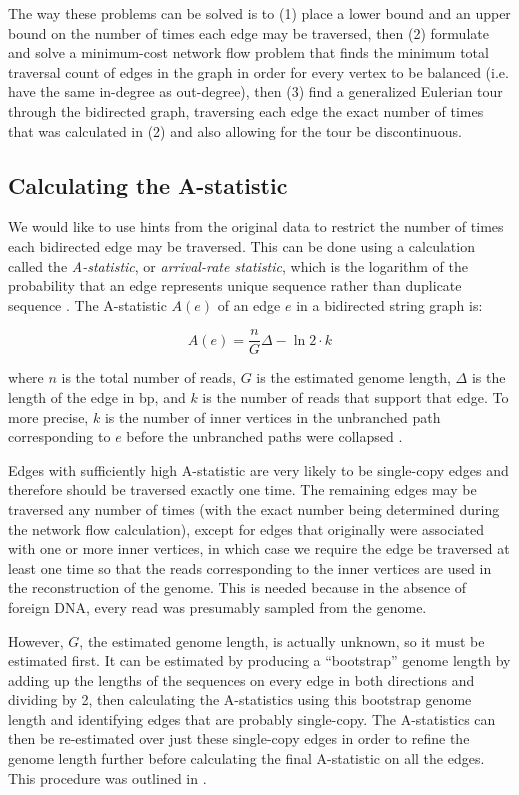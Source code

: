 \documentclass[12pt]{article}
\newcommand{\KeyTerm}[1]{{\it #1}}
\begin{document}
The way these problems can be solved is to (1) place a lower bound and an upper
bound on the number of times each edge may be traversed, then (2) formulate and
solve a minimum-cost network flow problem that finds the minimum total traversal
count of edges in the graph in order for every vertex to be balanced (i.e. have
the same in-degree as out-degree), then (3) find a generalized Eulerian tour
through the bidirected graph, traversing each edge the exact number of times
that was calculated in (2) and also allowing for the tour be discontinuous.

\subsection{Calculating the A-statistic}

We would like to use hints from the original data to restrict the number of
times each bidirected edge may be traversed.  This can be done using a
calculation called the \KeyTerm{A-statistic}, or \KeyTerm{arrival-rate
statistic}, which is the logarithm of the probability that an edge represents
unique sequence rather than duplicate sequence \cite{Myers2005}.  The A-statistic
$A(e)$ of an edge $e$ in a bidirected string graph is:

\[ A(e) = \frac{n}{G} \Delta - \ln{2} \cdot {k} \]

where $n$ is the total number of reads, $G$ is the estimated genome length,
$\Delta$ is the length of the edge in bp, and $k$ is the number of reads that
support that edge.  To more precise, $k$ is the number of inner vertices in the
unbranched path corresponding to $e$ before the unbranched paths were collapsed
\cite{Myers2005}.

Edges with sufficiently high A-statistic are very likely to be single-copy edges
and therefore should be traversed exactly one time.  The remaining edges may be
traversed any number of times (with the exact number being determined during the
network flow calculation), except for edges that originally were associated with
one or more inner vertices, in which case we require the edge be traversed at
least one time so that the reads corresponding to the inner vertices are used in
the reconstruction of the genome.  This is needed because in the absence of
foreign DNA, every read was presumably sampled from the genome.

However, $G$, the estimated genome length, is actually unknown, so it must be
estimated first.  It can be estimated by producing a ``bootstrap'' genome length
by adding up the lengths of the sequences on every edge in both directions and
dividing by 2, then calculating the A-statistics using this bootstrap genome
length and identifying edges that are probably single-copy.  The A-statistics
can then be re-estimated over just these single-copy edges in order to refine
the genome length further before calculating the final A-statistic on all the
edges.  This procedure was outlined in \cite{Myers2005}.
\end{document}
